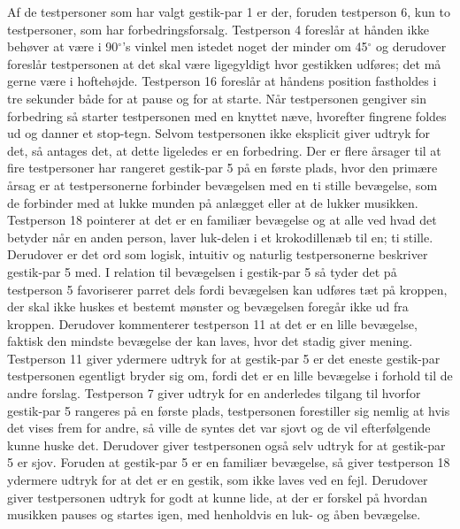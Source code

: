 Af de testpersoner som har valgt gestik-par 1 er der, foruden testperson 6, kun to testpersoner, som har forbedringsforsalg. Testperson 4 foreslår at hånden ikke behøver at være i 90$^{\circ}$'s vinkel men istedet noget der minder om 45$^{\circ}$ og derudover foreslår testpersonen at det skal være ligegyldigt hvor gestikken udføres; det må gerne være i hoftehøjde. Testperson 16 foreslår at håndens position fastholdes i tre sekunder både for at pause og for at starte. Når testpersonen gengiver sin forbedring så starter testpersonen med en knyttet næve, hvorefter fingrene foldes ud og danner et stop-tegn. Selvom testpersonen ikke eksplicit giver udtryk for det, så antages det, at dette ligeledes er en forbedring. \blankline
%
Der er flere årsager til at fire testpersoner har rangeret gestik-par 5 på en første plads, hvor den primære årsag er at testpersonerne forbinder bevægelsen med en ti stille bevægelse, som de forbinder med at lukke munden på anlægget eller at de lukker musikken. Testperson 18 pointerer at det er en familiær bevægelse og at alle ved hvad det betyder når en anden person, laver luk-delen i et krokodillenæb til en; ti stille. Derudover er det ord som logisk, intuitiv og naturlig testpersonerne beskriver gestik-par 5 med. I relation til bevægelsen i gestik-par 5 så tyder det på testperson 5 favoriserer parret dels fordi bevægelsen kan udføres tæt på kroppen, der skal ikke huskes et bestemt mønster og bevægelsen foregår ikke ud fra kroppen. Derudover kommenterer testperson 11 at det er en lille bevægelse, faktisk den mindste bevægelse der kan laves, hvor det stadig giver mening. Testperson 11 giver ydermere udtryk for at gestik-par 5 er det eneste gestik-par testpersonen egentligt bryder sig om, fordi det er en lille bevægelse i forhold til de andre forslag. Testperson 7 giver udtryk for en anderledes tilgang til hvorfor gestik-par 5 rangeres på en første plads, testpersonen forestiller sig nemlig at hvis det vises frem for andre, så ville de syntes det var sjovt og de vil efterfølgende kunne huske det. Derudover giver testpersonen også selv udtryk for at gestik-par 5 er sjov. Foruden at gestik-par 5 er en familiær bevægelse, så giver testperson 18 ydermere udtryk for at det er en gestik, som ikke laves ved en fejl. Derudover giver testpersonen udtryk for godt at kunne lide, at der er forskel på hvordan musikken pauses og startes igen, med henholdvis en luk- og åben bevægelse. 


